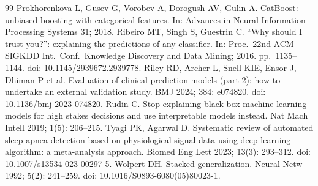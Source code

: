 \documentclass[11pt,a4paper]{article}
\begin{document}
\begin{thebibliography}{99}
 Prokhorenkova L, Gusev G, Vorobev A, Dorogush AV, Gulin A. CatBoost: unbiased boosting with categorical features. In: Advances in Neural Information Processing Systems 31; 2018.
 Ribeiro MT, Singh S, Guestrin C. ``Why should I trust you?'': explaining the predictions of any classifier. In: Proc.\ 22nd ACM SIGKDD Int.\ Conf.\ Knowledge Discovery and Data Mining; 2016. pp.\ 1135--1144. doi: 10.1145/2939672.2939778.
 Riley RD, Archer L, Snell KIE, Ensor J, Dhiman P et al. Evaluation of clinical prediction models (part 2): how to undertake an external validation study. BMJ 2024; 384: e074820. doi: 10.1136/bmj-2023-074820.
 Rudin C. Stop explaining black box machine learning models for high stakes decisions and use interpretable models instead. Nat Mach Intell 2019; 1(5): 206--215.
 Tyagi PK, Agarwal D. Systematic review of automated sleep apnea detection based on physiological signal data using deep learning algorithm: a meta-analysis approach. Biomed Eng Lett 2023; 13(3): 293--312. doi: 10.1007/s13534-023-00297-5.
 Wolpert DH. Stacked generalization. Neural Netw 1992; 5(2): 241--259. doi: 10.1016/S0893-6080(05)80023-1.
\end{thebibliography}
\end{document}
